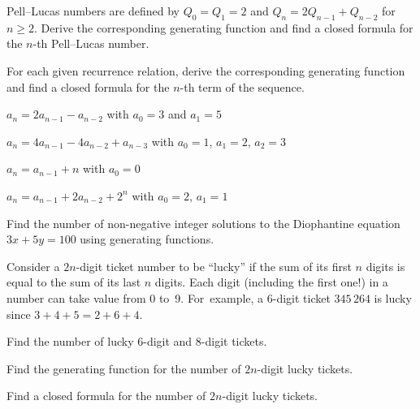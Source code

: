 \documentclass[a4paper,12pt]{article}
\begin{document}
\begin{tasks}[align=right,left=0pt]
    \item Pell--Lucas numbers are defined by $Q_{0} = Q_{1} = 2$ and $Q_{n} = 2 Q_{n-1} + Q_{n-2}$ for $n \geq 2$.
    Derive the corresponding generating function and find a closed formula for the $n$-th Pell--Lucas number.


    \item For each given recurrence relation, derive the corresponding generating function and find a closed formula for the $n$-th term of the sequence.

    \begin{subtasks}
        \item $a_n = 2a_{n-1} - a_{n-2}$ with $a_0 = 3$ and $a_1 = 5$
        \item $a_{n} = 4a_{n-1} - 4a_{n-2} + a_{n-3}$ with $a_{0} = 1$, $a_{1} = 2$, $a_{2} = 3$
        \item $a_{n} = a_{n-1} + n$ with $a_0 = 0$
        \item $a_{n} = a_{n-1} + 2a_{n-2} + 2^n$ with $a_0 = 2$, $a_1 = 1$
    \end{subtasks}


    \item Find the number of non-negative integer solutions to the Diophantine equation $3x + 5y = 100$ using generating functions.


    \item Consider a $2n$-digit ticket number to be \enquote{lucky} if the sum of its first $n$ digits is equal to the sum of its last $n$ digits.
    Each digit (including the first one!) in a number can take value from 0 to~9.
    For~example, a 6-digit ticket $345\,264$ is lucky since $3+4+5 = 2+6+4$.

    \begin{subtasks}
        \item Find the number of lucky 6-digit and 8-digit tickets.
        \item Find the generating function for the number of $2n$-digit lucky tickets.
        \item Find a closed formula for the number of $2n$-digit lucky tickets.
    \end{subtasks}



\end{tasks}
\end{document}
